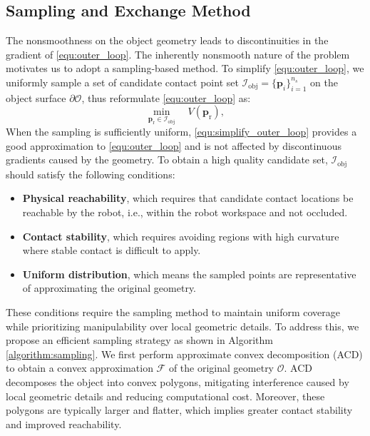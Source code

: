 \subsection{Sampling and Exchange Method}\label{sec:sampling&exchange}
The nonsmoothness on the object geometry leads to discontinuities in the gradient of \eqref{equ:outer_loop}. The inherently nonsmooth nature of the problem motivates us to adopt a sampling-based method. To simplify \eqref{equ:outer_loop}, we uniformly sample a set of candidate contact point set $\mathcal{I}_{\text{obj}} = \{\boldsymbol{p}_i\}_{i=1}^{n_s}$ on the object surface $\partial \mathcal{O}$, thus reformulate \eqref{equ:outer_loop} as:
\begin{equation}
 \min_{\boldsymbol{p}_{\text{r}} \in \mathcal{I}_{\text{obj}}}
 \quad V(\boldsymbol{p}_{\text{r}}),\label{equ:simplify_outer_loop}
\end{equation}
When the sampling is sufficiently uniform, \eqref{equ:simplify_outer_loop} provides a good approximation to \eqref{equ:outer_loop} and is not affected by discontinuous gradients caused by the geometry. To obtain a high quality candidate set, $\mathcal{I}_{\text{obj}}$ should satisfy the following conditions:
\begin{itemize}
 \item \textbf{Physical reachability}, which requires that candidate contact locations be reachable by the robot, i.e., within the robot workspace and not occluded.
 \item \textbf{Contact stability}, which requires avoiding regions with high curvature where stable contact is difficult to apply.
 \item \textbf{Uniform distribution}, which means the sampled points are representative of approximating the original geometry.
\end{itemize}
These conditions require the sampling method to maintain uniform coverage while prioritizing manipulability over local geometric details. To address this, we propose an efficient sampling strategy as shown in Algorithm \ref{algorithm:sampling}. We first perform approximate convex decomposition (ACD) \cite{lien2007approximate} to obtain a convex approximation $\mathcal{F}$ of the original geometry $\mathcal{O}$. ACD decomposes the object into convex polygons, mitigating interference caused by local geometric details and reducing computational cost. Moreover, these polygons are typically larger and flatter, which implies greater contact stability and improved reachability.

